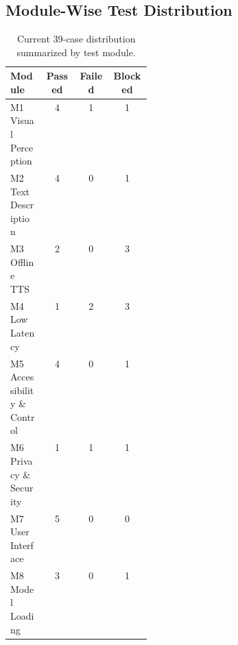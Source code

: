 \documentclass[conference]{IEEEtran}
\begin{document}
\subsection{Module-Wise Test Distribution}
\begin{table}[!t]
\centering
\small
\begin{tabular}{p{0.24\linewidth} c c c}
\toprule
Module & Passed & Failed & Blocked \\
\midrule
M1 Visual Perception & 4 & 1 & 1 \\
M2 Text Description & 4 & 0 & 1 \\
M3 Offline TTS & 2 & 0 & 3 \\
M4 Low Latency & 1 & 2 & 3 \\
M5 Accessibility \& Control & 4 & 0 & 1 \\
M6 Privacy \& Security & 1 & 1 & 1 \\
M7 User Interface & 5 & 0 & 0 \\
M8 Model Loading & 3 & 0 & 1 \\
\bottomrule
\end{tabular}
\caption{Current 39-case distribution summarized by test module.}
\label{tab:moduletestsummary}
\end{table}
\end{document}
